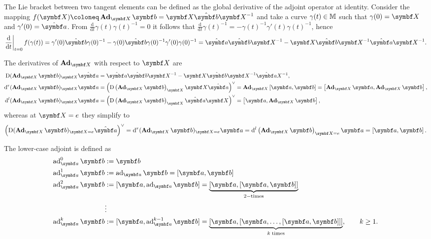 The Lie bracket between two tangent elements can be defined as the global derivative of the adjoint operator at identity. Consider the mapping $f(\X) \coloneq \bAd_\X \b = \X \hat \b \X^{-1}$ and take a curve $\gamma(t) \in \mathbb{M}$ such that $\gamma(0) = \X$ and $\gamma'(0) = \hat \a$. From $\frac{\mathrm{d}}{\mathrm{d}t} \gamma(t) \gamma(t)^{-1} = 0$ it follows that $\frac{\mathrm{d}}{\mathrm{d}t} \gamma(t)^{-1} = - \gamma(t)^{-1} \gamma'(t) \gamma(t)^{-1}$, hence
\begin{equation}
  \left. \frac{\mathrm{d}}{\mathrm{d}t} \right|_{t=0} f(\gamma(t))  = \gamma'(0) \hat \b \gamma(0)^{-1} - \gamma(0) \hat \b \gamma(0)^{-1} \gamma'(0) \gamma(0)^{-1} = \hat \a \hat \b \X^{-1} - \X \hat \b \X^{-1} \hat \a \X^{-1} .
\end{equation}
\begin{properties}
  The derivatives of $\bAd_\X$ with respect to $\X$ are
  \begin{subequations}
    \begin{align}
    \label{eq:bAd_D}
    \mathrm{D} (\bAd_\X \b)_\X \hat \a &= \hat \a \hat \b \X^{-1} - \X \hat \b \X^{-1} \hat \a X^{-1}, \\
    \label{eq:bAd_dr}
    \mathrm{d}^r (\bAd_\X \b)_\X \a &= \left( \mathrm{D} \left(\bAd_\X \b \right)_\X \X \hat \a \right)^\vee = \bAd_\X \left[ \a, \b \right] = \left[ \bAd_\X \a, \bAd_\X \b \right], \\
    \label{eq:bAd_dl}
    \mathrm{d}^l (\bAd_\X \b)_\X \a &= \left( \mathrm{D} \left(\bAd_\X \b \right)_\X \hat \a \X \right)^\vee = \left[ \a, \bAd_\X \b \right],
    \end{align}
  \end{subequations}
  whereas at $\X = \id$ they simplify to
  \begin{equation}
    \left( \mathrm{D} (\bAd_\X \b)_{\X = \id} \hat \a \right)^\vee = \mathrm{d}^r (\bAd_\X \b)_{\X = \id} \a= \mathrm{d}^l \left(\bAd_\X \b \right)_{\X = \id}  \a = \left[ \a, \b \right].
  \end{equation}
\end{properties}
The lower-case adjoint is defined as
\begin{equation}
  \label{eq:lowercase_adjoint}
  \begin{aligned}
    \ad_\a^0 \b & : = \b                                                                                                           \\
    \ad_\a^1 \b & : = \ad_\a \b = [\a,\b]                                                                                          \\
    \ad_\a^2 \b & : =[\a,  \ad_\a \b] = \underbrace{[\a,[\a,\b]]}_{2-\mathrm{times}}                                               \\
                & \vdots                                                                                                           \\
    \ad_\a^k \b & := [\a, \ad_\a^{k - 1} \b] = \underbrace{[\a, [ \a , \ldots, [\a,\b]]]}_{k \; \mathrm{times}} , \qquad k \geq 1.
  \end{aligned}
\end{equation}
